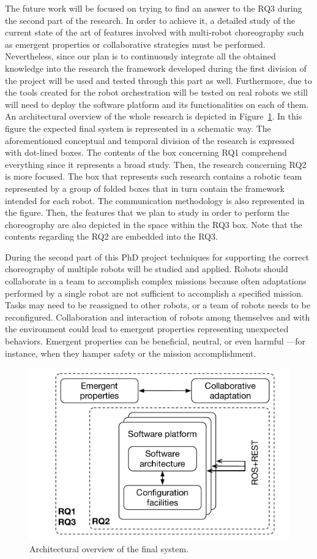 The future work will be focused on trying to find an answer to the RQ3 during the second part of the research.
In order to achieve it, a detailed study of the current state of the art of features involved with multi-robot choreography such as emergent properties or collaborative strategies must be performed.
Nevertheless, since our plan is to continuously integrate all the obtained knowledge into the research the framework developed during the first division of the project will be used and tested through this part as well.
Furthermore, due to the tools created for the robot orchestration will be tested on real robots we still will need to deploy the software platform and its functionalities on each of them.
An architectural overview of the whole research is depicted in Figure~\ref{fig:overview}.
In this figure the expected final system is represented in a schematic way.
The aforementioned conceptual and temporal division of the research is expressed with dot-lined boxes.
The contents of the box concerning RQ1 comprehend everything since it represents a broad study.
Then, the research concerning RQ2 is more focused.
The box that represents such research contains a robotic team represented by a group of folded boxes that in turn contain the framework intended for each robot.
The communication methodology is also represented in the figure.
Then, the features that we plan to study in order to perform the choreography are also depicted in the space within the RQ3 box.
Note that the contents regarding the RQ2 are embedded into the RQ3.

During the second part of this PhD project techniques for supporting the correct choreography of multiple robots will be studied and applied.
Robots should collaborate in a team to accomplish complex missions because often adaptations performed by a single robot are not sufficient to accomplish a specified mission. 
Tasks may need to be reassigned to other robots, or a team of robots needs to be reconfigured. 
Collaboration and interaction of robots among themselves and with the environment could lead to emergent properties representing unexpected behaviors. Emergent properties can be beneficial, neutral, or even harmful ---for instance, when they hamper safety or the mission accomplishment.

\begin{figure}[!t]
\begin{center}
\includegraphics[width=1\linewidth]{Figures/research.pdf}
\caption{Architectural overview of the final system.}
\label{fig:overview}
\end{center}
\end{figure}